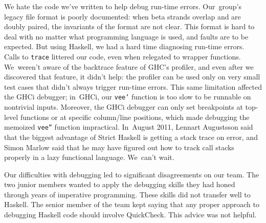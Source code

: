 \documentclass[nonatbib,preprint,blockstyle,times]{sigplanconf}
\newcommand\seclabel[1]{\label{sec:#1}}
\begin{document}
We hate the code we've written to help debug
run-time errors.
Our~group's legacy file
format is poorly documented: when beta
strands overlap and are doubly paired, the invariants of the
format are not clear.
This format is hard to deal with no matter what
programming language is used, and faults are to be expected.
But using Haskell, we had a hard time diagnosing run-time errors.
Calls to
\texttt{trace} 
littered our code,
even when relegated to wrapper functions.
We~weren't aware of the backtrace feature of GHC's profiler,
and even after we discovered that feature, it didn't help:
the profiler can be used only on very small test cases that didn't always trigger
run-time errors.
This same limitation affected the GHCi debugger; 
in~GHCi, our \texttt{vee'} function
is too slow to be runnable on nontrivial
inputs.
Moreover, the GHCi debugger can only set breakpoints at top-level functions
or at specific column/line positions, which made debugging the memoized
\texttt{vee''} function impractical.
In~August 2011, 
Lennart Augustsson said that the biggest advantage of Strict
Haskell is getting a stack trace on error,
and Simon Marlow said that he may have figured out how to track call
stacks properly in a lazy functional language.
We~can't wait.

Our difficulties with debugging led to significant disagreements on
our team.
The two junior members wanted to apply the debugging
skills they had honed through years of imperative programming.
These skills did not transfer well to Haskell.
The senior member of the team kept saying that any proper approach to
debugging Haskell code should involve QuickCheck.
This advice was not helpful.

\seclabel{awkward-quickcheck}
\end{document}
